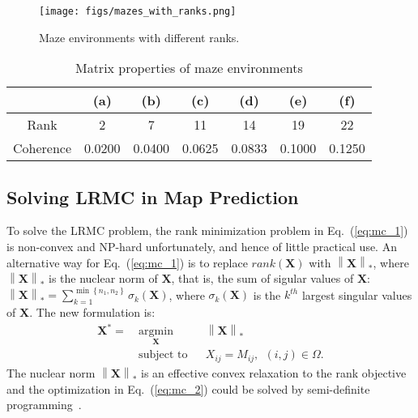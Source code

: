 \begin{figure} \vspace{-3pt}
  \centering
  	{\label{fig:mazes_1}\texttt{[image: figs/mazes\_with\_ranks.png]}}
  \caption{\small Maze environments with different ranks.
  } \vspace{-10pt}
\label{fig:mazes_1}  
\end{figure}

\begin{table}[h]

\caption{Matrix properties of maze environments} %
\centering %
\begin{tabularx}{\linewidth}{ccccccc}%
\hline\hline %
   & (a) & (b) & (c) & (d) & (e) & (f)\\
\hline %
Rank & 2 & 7 & 11 & 14 & 19 & 22\\ %
Coherence & 0.0200 & 0.0400 & 0.0625 & 0.0833 & 0.1000 & 0.1250\\ %
\hline %
\end{tabularx}
\label{tb:maze_prop}
\end{table}


\subsection{Solving LRMC in Map Prediction}
\label{sect:static}

To solve the LRMC problem, 
the rank minimization problem in Eq.~(\ref{eq:mc_1}) is non-convex and NP-hard unfortunately, and hence of little practical use. An alternative way for Eq.~(\ref{eq:mc_1}) is to replace $rank(\mathbf{X})$ with $\left \| \mathbf{X} \right \|_*$, where $\left \| \mathbf{X} \right \|_*$ is the nuclear norm of $\mathbf{X}$, that is, the sum of sigular values of $\mathbf{X}$: $\left \| \mathbf{X} \right \|_* = \sum_{k=1}^{\min \left \{ n_1, n_2 \right \}}\sigma_k(\mathbf{X})$, where $\sigma_k(\mathbf{X})$ is the $k^{th}$ largest singular values of $\mathbf{X}$. The new formulation is:
\begin{equation}
    \label{eq:mc_2}
    \begin{aligned}
        \mathbf{X}^* = ~&\underset{\mathbf{X}}{\text{argmin}} 
               &&\left \| \mathbf{X} \right \|_*\\
               &\text{subject to}
               && X_{ij} = M_{ij},~~\left ( i, j \right )\in \Omega.
    \end{aligned}
\end{equation}
The nuclear norm $\left \| \mathbf{X} \right \|_*$ is an effective convex relaxation to the rank objective and the optimization in Eq.~(\ref{eq:mc_2}) could be solved by semi-definite programming~\cite{laurent2014positive}.

